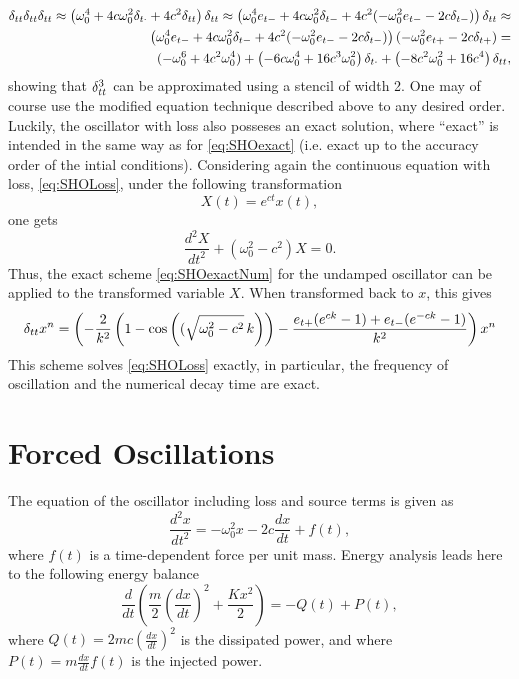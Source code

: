 \begin{align*}
    \delta_{tt}\delta_{tt}\delta_{tt} \approx \left( \omega_0^4 + 4c \omega_0^2 \delta_{t\cdot} + 4c^2 \delta_{tt}\right)\delta_{tt} \approx                                              
    \left( \omega_0^4e_{t-} + 4c \omega_0^2 \delta_{t-} + 4c^2 (-\omega_0^2e_{t-} -2c\delta_{t-})\right)\delta_{tt} \approx                                          \\\left( \omega_0^4e_{t-} + 4c \omega_0^2 \delta_{t-} + 4c^2 (-\omega_0^2e_{t-} -2c\delta_{t-})\right)(-\omega_0^2e_{t+} -2c\delta_{t+})= \\
    (-\omega_0^6 + 4c^2 \omega_0^4) + \left(-6 c \omega_0^4 + 16 c^3 \omega_0^2 \right)\delta_{t\cdot} + \left( -8 c^2 \omega_0^2 + 16 c^4\right)\delta_{tt}, 
\end{align*}
showing that $\delta_{tt}^3$ can be approximated using a stencil of width 2. One may of course use the modified equation technique described above to any desired order. Luckily, the oscillator with loss also posseses an exact solution, where ``exact'' is intended in the same way as for \eqref{eq:SHOexact} (i.e. exact up to the accuracy order of the intial conditions). Considering again the continuous equation with loss, \eqref{eq:SHOLoss}, under the following transformation
\begin{equation}
    X(t) = e^{ct} x(t),
\end{equation}
one gets
\begin{equation}
    \frac{d^2X}{dt^2} + \left(\omega_0^2-c^2 \right) X = 0.
\end{equation}
Thus, the exact scheme \eqref{eq:SHOexactNum} for the undamped oscillator can be applied to the transformed variable $X$. When transformed back to $x$, this gives
\begin{equation}\label{eq:SHO2}
    \delta_{tt} x^n = \left(-\frac{2}{k^2}\left(1 - \cos\left((\sqrt{\omega_0^2-c^2} \, k\right) \right)- \frac{e_{t+}(e^{ck}-1) + e_{t-}(e^{-ck}-1)}{k^2}\right)x^n
\end{equation}
This scheme solves \eqref{eq:SHOLoss} exactly, in particular, the frequency of oscillation and the numerical decay time are exact.



\section{Forced Oscillations}

The equation of the oscillator including loss and source terms is given as
\begin{equation}\label{eq:SHOForced}
    \frac{d^2 x}{dt^2} = -\omega_0^2 x - 2c \frac{dx}{dt} + f(t),
\end{equation}
where $f(t)$ is a time-dependent force per unit mass. Energy analysis leads here to the following energy balance
\begin{equation}
\frac{d}{dt}\left( \frac{m}{2} \left(\frac{dx}{dt}\right)^2 + \frac{K x^2}{2}   \right) = - Q(t) + P(t),
\end{equation}
where $Q(t) = 2mc \left(\frac{dx}{dt}\right)^2$ is the dissipated power, and where $P(t) = m\frac{dx}{dt}f(t)$ is the injected power.




